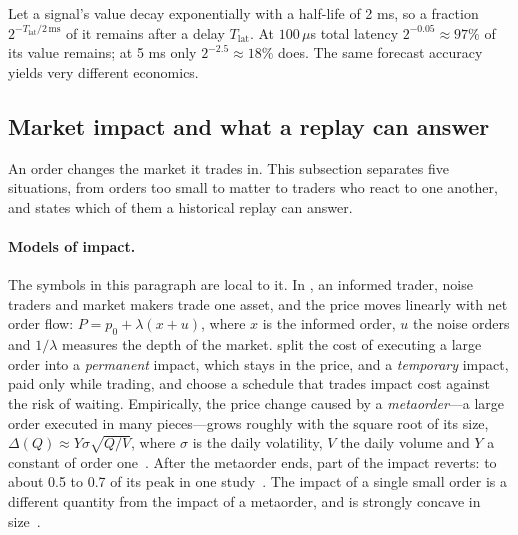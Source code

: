 \begin{example}
Let a signal's value decay exponentially with a half-life of 2 ms, so a fraction
$2^{-T_{\text{lat}}/2\,\mathrm{ms}}$ of it remains after a delay $T_{\text{lat}}$. At $100\,\mu$s total latency
$2^{-0.05} \approx 97\%$ of its value remains; at 5 ms only $2^{-2.5} \approx 18\%$ does. The same
forecast accuracy yields very different economics.
\end{example}

\subsection{Market impact and what a replay can answer}
\label{sec:impact}

An order changes the market it trades in. This subsection separates five situations, from orders too small to matter
to traders who react to one another, and states which of them a historical replay can answer.

\paragraph{Models of impact.} The symbols in this paragraph are local to it. In \citet{kyle1985}, an informed trader, noise traders and market makers trade
one asset, and the price moves linearly with net order flow: $P = p_0 + \lambda(x + u)$, where $x$ is the informed
order, $u$ the noise orders and $1/\lambda$ measures the depth of the market. \citet{almgren2001} split the cost of
executing a large order into a \emph{permanent} impact, which stays in the price, and a \emph{temporary} impact, paid
only while trading, and choose a schedule that trades impact cost against the risk of waiting. Empirically, the price
change caused by a \emph{metaorder}---a large order executed in many pieces---grows roughly with the square root of
its size, $\Delta(Q) \approx Y \sigma \sqrt{Q/V}$, where $\sigma$ is the daily volatility, $V$ the daily volume and
$Y$ a constant of order one~\citep{toth2011,moro2009,bacry2015impact}.
After the metaorder ends, part of the impact reverts: to about 0.5 to 0.7 of its peak in one
study~\citep{moro2009}. The impact of a single small order is a different quantity from the impact of a metaorder,
and is strongly concave in size~\citep{toth2011}.

